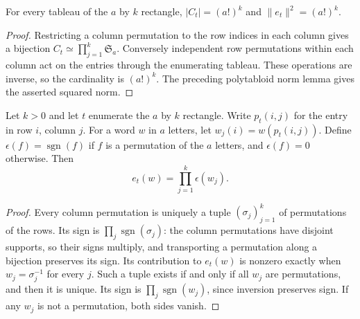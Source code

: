 \begin{lemma}
\label{lem:rectangular-initial-norm}
\leanok
For every tableau of the $a$ by $k$ rectangle,
$|C_t|=(a!)^k$ and $\|e_t\|^2=(a!)^k$.
\end{lemma}
\begin{proof}
Restricting a column permutation to the row indices in each column
gives a bijection $C_t\simeq\prod_{j=1}^k\mathfrak S_a$.
Conversely independent row permutations within each column act
on the entries through the enumerating tableau. These operations
are inverse, so the cardinality is $(a!)^k$. The preceding
polytabloid norm lemma gives the asserted squared norm.
\end{proof}

\begin{lemma}
\label{lem:rectangular-column-tensor}
\leanok
Let $k>0$ and let $t$ enumerate the $a$ by $k$ rectangle. Write
$p_t(i,j)$ for the entry in row $i$, column $j$. For a word $w$ in
$a$ letters, let $w_j(i)=w(p_t(i,j))$. Define
$\epsilon(f)=\operatorname{sgn}(f)$ if $f$ is a permutation of the
$a$ letters, and $\epsilon(f)=0$ otherwise. Then
\[
 e_t(w)=\prod_{j=1}^k\epsilon(w_j).
\]
\end{lemma}
\begin{proof}
Every column permutation is uniquely a tuple $(\sigma_j)_{j=1}^k$
of permutations of the rows. Its sign is $\prod_j\operatorname{sgn}(\sigma_j)$:
the column permutations have disjoint supports, so their signs multiply,
and transporting a permutation along a bijection preserves its sign.
Its contribution to $e_t(w)$ is nonzero exactly when
$w_j=\sigma_j^{-1}$ for every $j$. Such a tuple exists if and only
if all $w_j$ are permutations, and then it is unique. Its sign is
$\prod_j\operatorname{sgn}(w_j)$, since inversion preserves sign.
If any $w_j$ is not a permutation, both sides vanish.
\end{proof}

